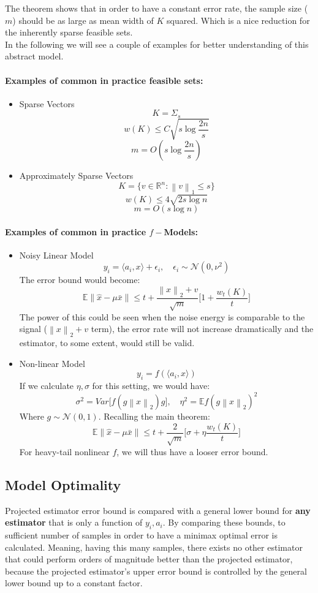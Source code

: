 \documentclass{amsart}
\theoremstyle{definition}
\theoremstyle{remark}
\numberwithin{equation}{section}
\newcommand\norm[1]{\left\lVert#1\right\rVert}
\begin{document}
The theorem shows that in order to have a constant error rate, the sample size ($m$) should be as large as mean width of $K$ squared. Which is a nice reduction for the inherently sparse feasible sets.\\
In the following we will see a couple of examples for better understanding of this abstract model.
\paragraph{Examples of common in practice feasible sets:}
\begin{itemize}
\item Sparse Vectors
\[
K = \Sigma_s
\]
\[
w(K)\leq C \sqrt{s\log \frac{2n}{s}}
\]
\[ m = O(s\log \frac{2n}{s})\]
\item Approximately Sparse Vectors
\[ K = \{v \in \mathbb{R}^n: \norm{v}_1\leq s \}\]
\[ w(K) \leq 4 \sqrt{2 s \log n}\]
\[ m = O(s \log n)\]
\end{itemize}
\paragraph{Examples of common in practice $f-$Models:}
\begin{itemize}
\item Noisy Linear Model
\[
y_i = \langle a_i,x \rangle+\epsilon_i,\quad \epsilon_i \sim \mathcal{N}(0,\nu^2)
\]
The error bound would become:
\[
\mathbb{E}\norm{\hat{x}-\mu\bar{x}} \leq t + \frac{\norm{x}_2+v}{\sqrt{m}}\bigg[1+\frac{w_t(K)}{t}\bigg]
\]
The power of this could be seen when the noise energy is comparable to the signal ($\norm{x}_2+v$ term), the error rate will not increase dramatically and the estimator, to some extent, would still be valid.
\item Non-linear Model
\[
y_i = f(\langle a_i,x \rangle)
\]
If we calculate $\eta,\sigma$ for this setting, we would have:
\[
\sigma^2 = Var\big[f(g\norm{x}_2)g\big],\quad \eta^2 = \mathbb{E}f(g\norm{x}_2)^2
\]
Where $g\sim\mathcal{N}(0,1)$. Recalling the main theorem:
\[
\mathbb{E}\norm{\hat{x}-\mu\bar{x}}\leq t+ \frac{2}{\sqrt{m}}\bigg[ \sigma + \eta \frac{w_t(K)}{t}\bigg]
\]
For heavy-tail nonlinear $f$, we will thus have a looser error bound.

\end{itemize}
\subsection{Model Optimality}
Projected estimator error bound is compared with a general lower bound for \textbf{any estimator} that is only a function of $y_i,a_i$. By comparing these bounds, to sufficient number of samples in order to have a minimax optimal error is calculated. Meaning, having this many samples, there exists no other estimator that could perform orders of magnitude better than the projected estimator, because the projected estimator's upper error bound is controlled by the general lower bound up to a constant factor.
\end{document}
